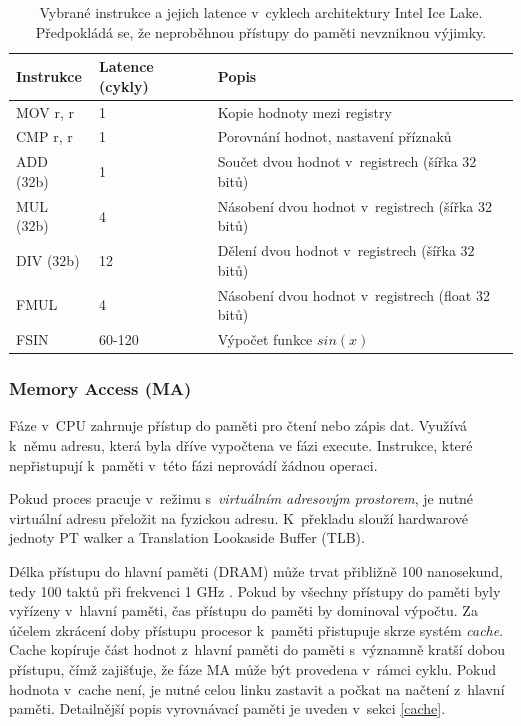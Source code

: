 \begin{table}[ht]
\centering
\begin{tabular}{|l|l|l|}
\hline
Instrukce & Latence (cykly) & Popis                                                  \\ \hline\hline
MOV r, r  & 1       & Kopie hodnoty mezi registry                                    \\ \hline
CMP r, r  & 1       & Porovnání hodnot, nastavení příznaků                           \\ \hline
ADD (32b) & 1       & Součet dvou hodnot v~registrech (šířka 32 bitů)                \\ \hline
MUL (32b) & 4       & Násobení dvou hodnot v~registrech (šířka 32 bitů)              \\ \hline
DIV (32b) & 12      & Dělení dvou hodnot v~registrech (šířka 32 bitů)                \\ \hline
FMUL      & 4       & Násobení dvou hodnot v~registrech (float 32 bitů)              \\ \hline
FSIN      & 60-120  & Výpočet funkce $sin(x)$                                        \\ \hline
\end{tabular}
\caption{Vybrané instrukce a jejich latence v~cyklech architektury Intel Ice Lake. Předpokládá se, že neproběhnou přístupy do paměti nevzniknou výjimky. \cite{instructionTables}}
\label{table:ex_latency}
\end{table}

\subsubsection{Memory Access (MA)}

Fáze  v~CPU zahrnuje přístup do paměti pro čtení nebo zápis dat.
Využívá k~němu adresu, která byla dříve vypočtena ve fázi execute.
Instrukce, které nepřistupují k~paměti v~této fázi neprovádí žádnou operaci.

Pokud proces pracuje v~režimu s~\emph{virtuálním adresovým prostorem}, je nutné virtuální adresu přeložit na fyzickou adresu.
K~překladu slouží hardwarové jednoty PT walker a Translation Lookaside Buffer (TLB).

Délka přístupu do hlavní paměti (DRAM) může trvat přibližně 100 nanosekund, tedy 100 taktů při frekvenci 1 GHz \cite{avs}.
Pokud by všechny přístupy do paměti byly vyřízeny v~hlavní paměti, čas přístupu do paměti by dominoval výpočtu.
Za účelem zkrácení doby přístupu procesor k~paměti přistupuje skrze systém \emph{cache}.
Cache kopíruje část hodnot z~hlavní paměti do paměti s~významně kratší dobou přístupu, čímž zajišťuje, že fáze MA může být provedena v~rámci cyklu.
Pokud hodnota v~cache není, je nutné celou linku zastavit a počkat na načtení z~hlavní paměti.
Detailnější popis vyrovnávací paměti je uveden v~sekci \ref{cache}.

